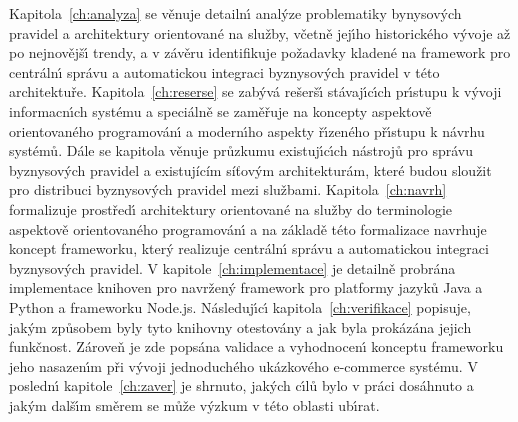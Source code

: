 Kapitola~\ref{ch:analyza} se věnuje detailn\'{\i} anal\'yze problematiky bynysov\'ych pravidel a
architektury orientované na služby, včetně jej\'{\i}ho historického v\'yvoje až po nejnovějš\'{\i} trendy,
a v závěru identifikuje požadavky kladené na framework pro centráln\'{\i} správu a
automatickou integraci byznysov\'ych pravidel v této architektuře. Kapitola~\ref{ch:reserse}
se zab\'yvá rešerš\'{\i} stávaj\'{\i}c\'{\i}ch pr\'{\i}stupu k v\'yvoji informacn\'{\i}ch systému a speciálně se zaměřuje
na koncepty aspektově orientovaného programován\'{\i} a modern\'{\i}ho aspekty ř\'{\i}zeného př\'{\i}stupu k návrhu
systémů. Dále se kapitola věnuje průzkumu existuj\'{\i}c\'{\i}ch nástrojů pro správu byznysov\'ych pravidel a existujícím
síťovým architekturám, které budou sloužit pro distribuci byznysových pravidel mezi službami.
Kapitola~\ref{ch:navrh} formalizuje prostřed\'{\i} architektury orientované na služby do terminologie
aspektově orientovaného programován\'{\i} a na základě této formalizace navrhuje koncept frameworku,
kter\'y realizuje centráln\'{\i} správu a automatickou integraci byznysov\'ych pravidel.
V kapitole~\ref{ch:implementace} je detailně probrána implementace knihoven pro navržen\'y framework
pro platformy jazyků Java a Python a frameworku Node.js. Následuj\'{\i}c\'{\i} kapitola~\ref{ch:verifikace}
popisuje, jak\'ym způsobem byly tyto knihovny otestovány a jak byla prokázána jejich funkčnost. Zároveň
je zde popsána validace a vyhodnocen\'{\i} konceptu frameworku jeho nasazen\'{\i}m při v\'yvoji
jednoduchého ukázkového e-commerce systému. V posledn\'{\i} kapitole~\ref{ch:zaver} je shrnuto, jak\'ych
c\'{\i}lů bylo v práci dosáhnuto a jak\'ym dalš\'{\i}m směrem se může v\'yzkum v této oblasti ub\'{\i}rat.
